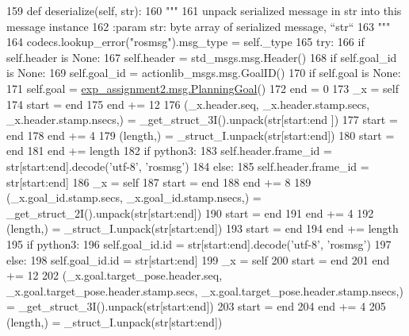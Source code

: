 \begin{DoxyCode}
159   \textcolor{keyword}{def }deserialize(self, str):
160     \textcolor{stringliteral}{"""}
161 \textcolor{stringliteral}{    unpack serialized message in str into this message instance}
162 \textcolor{stringliteral}{    :param str: byte array of serialized message, ``str``}
163 \textcolor{stringliteral}{    """}
164     codecs.lookup\_error(\textcolor{stringliteral}{"rosmsg"}).msg\_type = self.\_type
165     \textcolor{keywordflow}{try}:
166       \textcolor{keywordflow}{if} self.header \textcolor{keywordflow}{is} \textcolor{keywordtype}{None}:
167         self.header = std\_msgs.msg.Header()
168       \textcolor{keywordflow}{if} self.goal\_id \textcolor{keywordflow}{is} \textcolor{keywordtype}{None}:
169         self.goal\_id = actionlib\_msgs.msg.GoalID()
170       \textcolor{keywordflow}{if} self.goal \textcolor{keywordflow}{is} \textcolor{keywordtype}{None}:
171         self.goal = \hyperlink{classexp__assignment2_1_1msg_1_1__PlanningGoal_1_1PlanningGoal}{exp\_assignment2.msg.PlanningGoal}()
172       end = 0
173       \_x = self
174       start = end
175       end += 12
176       (\_x.header.seq, \_x.header.stamp.secs, \_x.header.stamp.nsecs,) = \_get\_struct\_3I().unpack(str[start:end
      ])
177       start = end
178       end += 4
179       (length,) = \_struct\_I.unpack(str[start:end])
180       start = end
181       end += length
182       \textcolor{keywordflow}{if} python3:
183         self.header.frame\_id = str[start:end].decode(\textcolor{stringliteral}{'utf-8'}, \textcolor{stringliteral}{'rosmsg'})
184       \textcolor{keywordflow}{else}:
185         self.header.frame\_id = str[start:end]
186       \_x = self
187       start = end
188       end += 8
189       (\_x.goal\_id.stamp.secs, \_x.goal\_id.stamp.nsecs,) = \_get\_struct\_2I().unpack(str[start:end])
190       start = end
191       end += 4
192       (length,) = \_struct\_I.unpack(str[start:end])
193       start = end
194       end += length
195       \textcolor{keywordflow}{if} python3:
196         self.goal\_id.id = str[start:end].decode(\textcolor{stringliteral}{'utf-8'}, \textcolor{stringliteral}{'rosmsg'})
197       \textcolor{keywordflow}{else}:
198         self.goal\_id.id = str[start:end]
199       \_x = self
200       start = end
201       end += 12
202       (\_x.goal.target\_pose.header.seq, \_x.goal.target\_pose.header.stamp.secs, 
      \_x.goal.target\_pose.header.stamp.nsecs,) = \_get\_struct\_3I().unpack(str[start:end])
203       start = end
204       end += 4
205       (length,) = \_struct\_I.unpack(str[start:end])

\end{DoxyCode}
